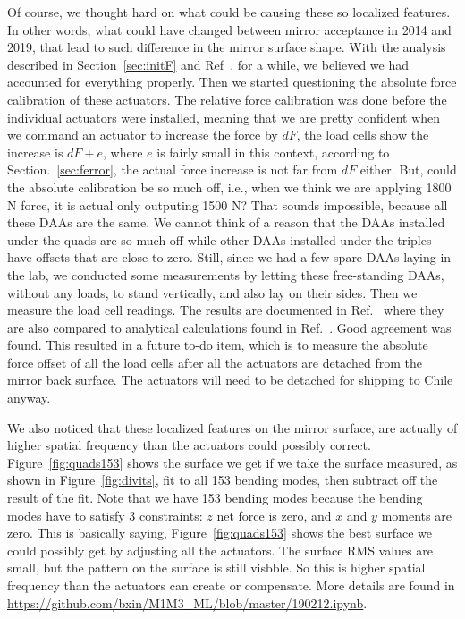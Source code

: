 \documentclass [twoside,openbib,12pt]{article}
\begin{document}
Of course, we thought hard on what could be causing these so
localized features. In other words, what could have changed between
mirror acceptance in 2014 and 2019, that lead to such difference in
the mirror surface shape.
With the analysis described in Section~\ref{sec:initF} and Ref~\cite{m1m3initF},
for a while, we believed we had accounted for everything
properly. Then we started questioning the absolute force calibration
of these actuators. The relative force calibration was done before the
individual actuators were installed, meaning that we are pretty
confident when we command an actuator to increase the force by
$dF$, the load cells show the increase is $dF+e$, where $e$ is fairly
small in this context, according to Section.~\ref{sec:ferror}, the actual
force increase is not far from $dF$ either.
But, could the absolute calibration be so much off, i.e., when we
think we are applying 1800 N force, it is actual only outputing 1500
N?
That sounds impossible, because all these DAAs are the same. We cannot
think of a reason that the DAAs installed under the quads are so much
off while other DAAs installed under the triples have offsets that are
close to zero. Still, since we had a few spare DAAs laying in the lab,
we conducted some measurements by letting these free-standing DAAs,
without any loads, to
stand vertically, and also lay on their sides. Then we measure the
load cell readings. The results are documented in Ref.~\cite{divitFEA}
where they are also compared to analytical calculations found in
Ref.~\cite{m1m3initF}. Good agreement was found.
This resulted in a future to-do item, which is to measure the absolute
force offset of all the load cells after all the actuators are detached from the
mirror back surface. The actuators will need to be detached for shipping to Chile anyway.

We also noticed that these localized features on the mirror surface,
are actually of higher spatial frequency than the actuators could
possibly correct. Figure~\ref{fig:quads153} shows the surface we get
if we take the surface measured, as shown in Figure~\ref{fig:divits},
fit to all 153 bending modes, then subtract off the result of the
fit. Note that we have 153 bending modes because the bending modes
have to satisfy 3 constraints: $z$ net force is zero, and $x$ and $y$
moments are zero. This is basically saying, Figure~\ref{fig:quads153}
shows the best surface we could possibly get by adjusting all the
actuators. The surface RMS values are small, but the pattern on the
surface is still visbble. So this is higher spatial frequency than the
actuators can create or compensate.
More details are found in \url{https://github.com/bxin/M1M3_ML/blob/master/190212.ipynb}.
\end{document}
